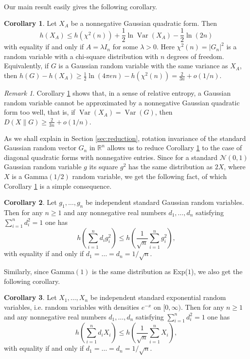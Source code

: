 \documentclass[11pt]{amsart}
\newcommand{\mc}[1]{\mathcal{{#1}}}
\newcommand{\1}{\mathbf{1}}
\newcommand{\R}{\mathbb{R}}
\DeclareMathOperator{\var}{Var}
\theoremstyle{definition}
\newtheorem{cor}{Corollary}
\theoremstyle{definition}
\theoremstyle{remark}
\newtheorem{rem}{Remark}
\begin{document}
\noindent Our main result easily gives the following corollary. 

\begin{cor}\label{thm:main}
Let $X_A$ be a nonnegative Gaussian quadratic form. Then
\[
	h\left( X_A \right) \leq h\left( \chi^2(n) \right) + \frac12 \ln  \var(X_A) - \frac12 \ln (2n)
\]
with equality if and only if $A= \lambda I_n$ for some $\lambda>0$. Here $\chi^2(n)= |G_n|^2$ is a random variable with a chi-square distribution with $n$ degrees of freedom. Equivalently, if $G$ is a Gaussian random variable with the same variance as $X_A$, then $h(G)-h(X_A) \geq \frac12\ln(4 \pi e n)-h(\chi^2(n)) = \frac{2}{3n} + o(1/n)$. 
\end{cor}


\begin{rem}
Corollary \ref{thm:main} shows that, in a sense of relative entropy, a Gaussian random variable cannot be approximated by a nonnegative Gaussian quadratic form too well, that is, if $\var(X_A)=\var(G)$, then $D(X \| G) \geq \frac{2}{3n}+o(1/n)$.   
\end{rem}

\noindent As we shall explain in Section \ref{sec:reduction}, rotation invariance of the standard Gaussian random vector $G_n$ in $\R^n$ allows us to reduce Corollary \ref{thm:main}  to the case of diagonal quadratic forms with nonnegative entries.   Since for a standard  $\mc{N}(0,1)$ Gaussian random variable $g$ its square $g^2$ has the same distribution as $2X$, where $X$ is a Gamma$(1/2)$ random variable, we get the following fact, of which Corollary \ref{thm:main} is a simple consequence. 

\begin{cor}\label{cor:1}
Let $g_1, \ldots, g_n$ be independent standard Gaussian random variables. Then for any $n\geq 1$ and any nonnegative real numbers $d_1, \ldots, d_n$ satisfying $\sum_{i=1}^n d_i^2 = 1$ one has
\[
	h\left( \sum_{i=1}^n d_i g_i^2 \right) \leq h\left( \frac{1}{\sqrt{n}}\sum_{i=1}^n g_i^2 \right), 
\]
with equality if and only if $d_1=\ldots= d_n=1/\sqrt{n}$.
\end{cor}

\noindent Similarly, since Gamma$(1)$ is the same distribution as Exp($1$), we also get the following corollary.

\begin{cor}\label{cor:2}
Let $X_1, \ldots, X_n$ be independent standard
exponential random variables, i.e. random variables with densities $e^{-x}$ on $[0, \infty)$. Then for any $n\geq 1$ and any nonnegative real numbers $d_1, \ldots, d_n$ satisfying $\sum_{i=1}^n d_i^2 = 1$ one has
\[
	h\left( \sum_{i=1}^n d_i X_i \right) \leq h\left( \frac{1}{\sqrt{n}}\sum_{i=1}^n X_i \right), 
\]
with equality if and only if $d_1=\ldots= d_n=1/\sqrt{n}$.
\end{cor}
\end{document}

